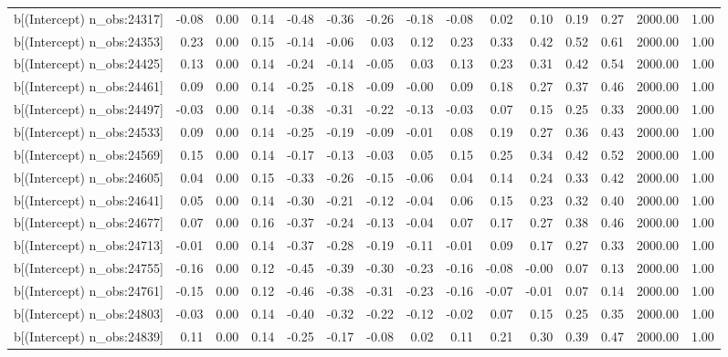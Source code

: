 \begin{table}[ht]
\begin{tabular}{rrrrrrrrrrrrrrr}
  b[(Intercept) n\_obs:24317] & -0.08 & 0.00 & 0.14 & -0.48 & -0.36 & -0.26 & -0.18 & -0.08 & 0.02 & 0.10 & 0.19 & 0.27 & 2000.00 & 1.00 \\ 
  b[(Intercept) n\_obs:24353] & 0.23 & 0.00 & 0.15 & -0.14 & -0.06 & 0.03 & 0.12 & 0.23 & 0.33 & 0.42 & 0.52 & 0.61 & 2000.00 & 1.00 \\ 
  b[(Intercept) n\_obs:24425] & 0.13 & 0.00 & 0.14 & -0.24 & -0.14 & -0.05 & 0.03 & 0.13 & 0.23 & 0.31 & 0.42 & 0.54 & 2000.00 & 1.00 \\ 
  b[(Intercept) n\_obs:24461] & 0.09 & 0.00 & 0.14 & -0.25 & -0.18 & -0.09 & -0.00 & 0.09 & 0.18 & 0.27 & 0.37 & 0.46 & 2000.00 & 1.00 \\ 
  b[(Intercept) n\_obs:24497] & -0.03 & 0.00 & 0.14 & -0.38 & -0.31 & -0.22 & -0.13 & -0.03 & 0.07 & 0.15 & 0.25 & 0.33 & 2000.00 & 1.00 \\ 
  b[(Intercept) n\_obs:24533] & 0.09 & 0.00 & 0.14 & -0.25 & -0.19 & -0.09 & -0.01 & 0.08 & 0.19 & 0.27 & 0.36 & 0.43 & 2000.00 & 1.00 \\ 
  b[(Intercept) n\_obs:24569] & 0.15 & 0.00 & 0.14 & -0.17 & -0.13 & -0.03 & 0.05 & 0.15 & 0.25 & 0.34 & 0.42 & 0.52 & 2000.00 & 1.00 \\ 
  b[(Intercept) n\_obs:24605] & 0.04 & 0.00 & 0.15 & -0.33 & -0.26 & -0.15 & -0.06 & 0.04 & 0.14 & 0.24 & 0.33 & 0.42 & 2000.00 & 1.00 \\ 
  b[(Intercept) n\_obs:24641] & 0.05 & 0.00 & 0.14 & -0.30 & -0.21 & -0.12 & -0.04 & 0.06 & 0.15 & 0.23 & 0.32 & 0.40 & 2000.00 & 1.00 \\ 
  b[(Intercept) n\_obs:24677] & 0.07 & 0.00 & 0.16 & -0.37 & -0.24 & -0.13 & -0.04 & 0.07 & 0.17 & 0.27 & 0.38 & 0.46 & 2000.00 & 1.00 \\ 
  b[(Intercept) n\_obs:24713] & -0.01 & 0.00 & 0.14 & -0.37 & -0.28 & -0.19 & -0.11 & -0.01 & 0.09 & 0.17 & 0.27 & 0.33 & 2000.00 & 1.00 \\ 
  b[(Intercept) n\_obs:24755] & -0.16 & 0.00 & 0.12 & -0.45 & -0.39 & -0.30 & -0.23 & -0.16 & -0.08 & -0.00 & 0.07 & 0.13 & 2000.00 & 1.00 \\ 
  b[(Intercept) n\_obs:24761] & -0.15 & 0.00 & 0.12 & -0.46 & -0.38 & -0.31 & -0.23 & -0.16 & -0.07 & -0.01 & 0.07 & 0.14 & 2000.00 & 1.00 \\ 
  b[(Intercept) n\_obs:24803] & -0.03 & 0.00 & 0.14 & -0.40 & -0.32 & -0.22 & -0.12 & -0.02 & 0.07 & 0.15 & 0.25 & 0.35 & 2000.00 & 1.00 \\ 
  b[(Intercept) n\_obs:24839] & 0.11 & 0.00 & 0.14 & -0.25 & -0.17 & -0.08 & 0.02 & 0.11 & 0.21 & 0.30 & 0.39 & 0.47 & 2000.00 & 1.00 \\ 

\end{tabular}
\end{table}
